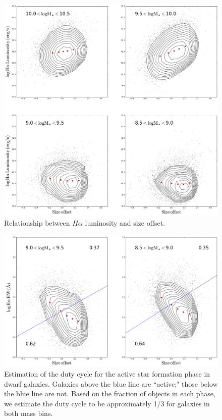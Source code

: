 \documentclass[iop]{emulateapj}
\begin{document}
\begin{figure}
	\centering
	\includegraphics[width=1.5 \columnwidth]{HA_LUM.png}
	\caption{Relationship between $H\alpha$ luminosity and size offset. }
     \label{fig:HA_lum}

\end{figure}

\begin{figure}
	\centering
	\includegraphics[width=1.5 \columnwidth]{HA_duty.png}
	\caption{Estimation of the duty cycle for the active star formation phase in dwarf galaxies. Galaxies above the blue line are ``active;" those below the blue line are not. Based on the fraction of objects in each phase, we estimate the duty cycle to be approximately 1/3 for galaxies in both mass bins.}
     \label{fig:HA_duty}

\end{figure}
\end{document}
